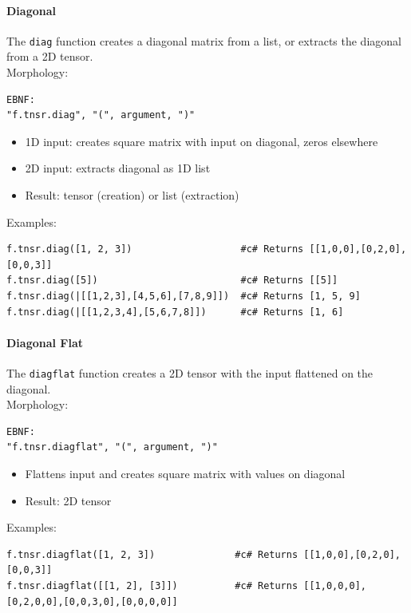 \paragraph{Diagonal}
The \texttt{diag} function creates a diagonal matrix from a list, or extracts the diagonal from a 2D tensor.\\
Morphology:
\begin{verbatim}
EBNF:
"f.tnsr.diag", "(", argument, ")"
\end{verbatim}
\begin{itemize}
\item 1D input: creates square matrix with input on diagonal, zeros elsewhere
\item 2D input: extracts diagonal as 1D list
\item Result: tensor (creation) or list (extraction)
\end{itemize}
Examples:
\begin{verbatim}
f.tnsr.diag([1, 2, 3])                   #c# Returns [[1,0,0],[0,2,0],[0,0,3]]
f.tnsr.diag([5])                         #c# Returns [[5]]
f.tnsr.diag(|[[1,2,3],[4,5,6],[7,8,9]])  #c# Returns [1, 5, 9]
f.tnsr.diag(|[[1,2,3,4],[5,6,7,8]])      #c# Returns [1, 6]
\end{verbatim}

\paragraph{Diagonal Flat}
The \texttt{diagflat} function creates a 2D tensor with the input flattened on the diagonal.\\
Morphology:
\begin{verbatim}
EBNF:
"f.tnsr.diagflat", "(", argument, ")"
\end{verbatim}
\begin{itemize}
\item Flattens input and creates square matrix with values on diagonal
\item Result: 2D tensor
\end{itemize}
Examples:
\begin{verbatim}
f.tnsr.diagflat([1, 2, 3])              #c# Returns [[1,0,0],[0,2,0],[0,0,3]]
f.tnsr.diagflat([[1, 2], [3]])          #c# Returns [[1,0,0,0],[0,2,0,0],[0,0,3,0],[0,0,0,0]]
\end{verbatim}

